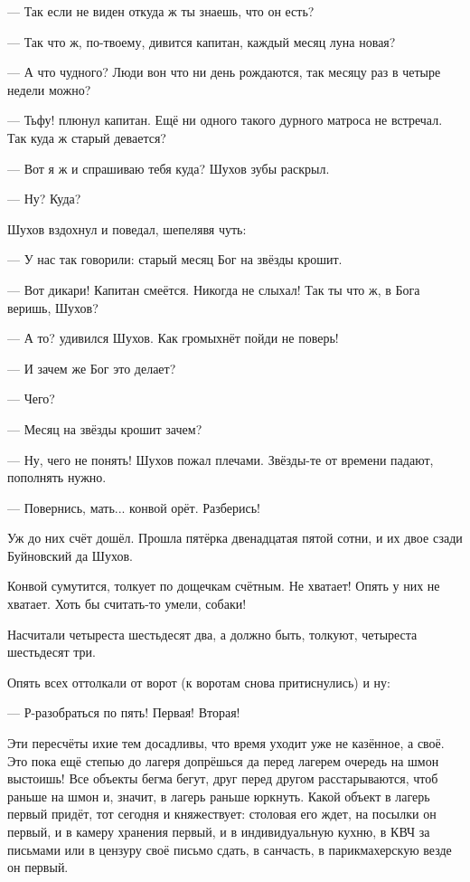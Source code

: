 --- Так если не виден \dash откуда ж ты знаешь, что он есть?

--- Так что ж, по-твоему, \dash дивится капитан, \Dash каждый месяц луна новая?

--- А что чудного? Люди вон что ни день рождаются, так месяцу раз в четыре недели можно?

--- Тьфу! \dash плюнул капитан. \Dash Ещё ни одного такого дурного матроса не встречал. Так куда ж
старый девается?

--- Вот я ж и спрашиваю тебя \dash куда? \dash Шухов зубы раскрыл.

--- Ну? Куда?

Шухов вздохнул и поведал, шепелявя чуть:

--- У нас так говорили: старый месяц Бог на звёзды крошит.

--- Вот дикари! \dash Капитан смеётся. \Dash Никогда не слыхал! Так ты что ж, в Бога веришь, Шухов?

--- А то? \dash удивился Шухов. \Dash Как громыхнёт \dash пойди не поверь!

--- И зачем же Бог это делает?

--- Чего?

--- Месяц на звёзды крошит \dash зачем?

--- Ну, чего не понять! \dash Шухов пожал плечами. \Dash Звёзды-те от времени падают, пополнять нужно.

--- Повернись, мать... \dash конвой орёт. \Dash Разберись!

Уж до них счёт дошёл. Прошла пятёрка двенадцатая пятой сотни, и их двое сзади \dash Буйновский да
Шухов.

Конвой сумутится, толкует по дощечкам счётным. Не хватает! Опять у них не хватает. Хоть бы
считать-то умели, собаки!

Насчитали четыреста шестьдесят два, а должно быть, толкуют, четыреста шестьдесят три.

Опять всех оттолкали от ворот (к воротам снова притиснулись) \dash и ну:

--- Р-разобраться по пять! Первая! Вторая!

Эти пересчёты ихие тем досадливы, что время уходит уже не казённое, а своё. Это пока ещё
степью до лагеря допрёшься да перед лагерем очередь на шмон выстоишь! Все объекты бегма
бегут, друг перед другом расстарываются, чтоб раньше на шмон и, значит, в лагерь раньше
юркнуть. Какой объект в лагерь первый придёт, тот сегодня и княжествует: столовая его ждет,
на посылки он первый, и в камеру хранения первый, и в индивидуальную кухню, в КВЧ за письмами
или в цензуру своё письмо сдать, в санчасть, в парикмахерскую \dash везде он первый.

